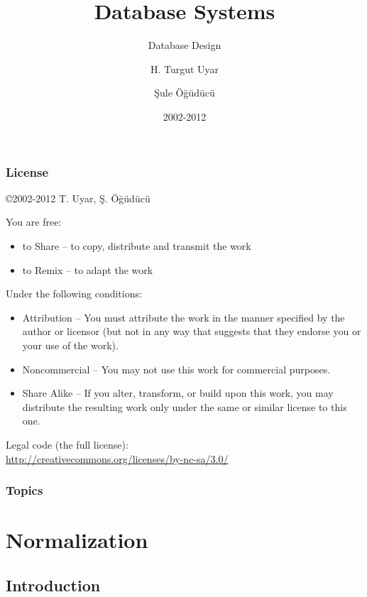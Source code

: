 \documentclass[dvipsnames]{beamer}
\title{Database Systems}
\subtitle{Database Design}
\author{H. Turgut Uyar \and Şule Öğüdücü}
\date{2002-2012}
\begin{document}
\begin{frame}
  \titlepage
\end{frame}

\begin{frame}
  \frametitle{License}

  \hfill
  \copyright 2002-2012 T. Uyar, Ş. Öğüdücü

  \vfill
  \begin{tiny}
    You are free:
    \begin{itemize}
      \item to Share -- to copy, distribute and transmit the work
      \item to Remix -- to adapt the work
    \end{itemize}

    Under the following conditions:
    \begin{itemize}
      \item Attribution -- You must attribute the work in the manner specified by
        the author or licensor (but not in any way that suggests that they
        endorse you or your use of the work).

      \item Noncommercial -- You may not use this work for commercial purposes.

      \item Share Alike -- If you alter, transform, or build upon this work, you
        may distribute the resulting work only under the same or similar license
        to this one.
    \end{itemize}
  \end{tiny}

  \vfill
  Legal code (the full license):\\
  \url{http://creativecommons.org/licenses/by-nc-sa/3.0/}
\end{frame}

\begin{frame}
  \frametitle{Topics}
  \tableofcontents
\end{frame}

\section{Normalization}

\subsection{Introduction}
\end{document}
